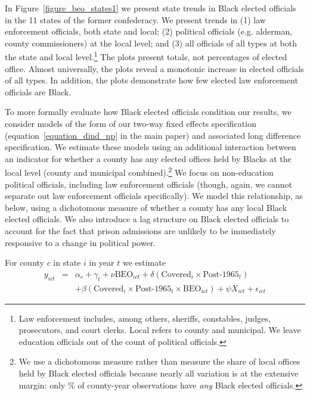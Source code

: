 \documentclass[12pt]{article}
\begin{document}
In Figure~\ref{figure_beo_states1} we present state trends in Black elected officials in the 11 states of the former confederacy.  We present trends in (1) law enforcement officials, both state and local; (2) political officials (e.g. alderman, county commissioners) at the local level; and (3) all officials of all types at both the state and local level.\footnote{Law enforcement includes, among others, sheriffs, constables, judges, prosecutors, and court clerks.  Local refers to county and municipal.  We leave education officials out of the count of political officials.}  The plots present totals, not percentages of elected office.  Almost universally, the plots reveal a monotonic increase in elected officials of all types.  In addition, the plots demonstrate how few elected law enforcement officials are Black.

To more formally evaluate how Black elected officials condition our results, we consider models of the form of our two-way fixed effects specification (equation~\ref{equation_dind_np} in the main paper) and associated long difference specification.  We estimate these models using an additional interaction between an indicator for whether a county has any elected offices held by Blacks at the local level (county and municipal combined).\footnote{We use a dichotomous measure rather than measure the share of local offices held by Black elected officials because nearly all variation is at the extensive margin: only \unskip\% of county-year observations have \emph{any} Black elected officials.}  We focus on non-education political officials, including law enforcement officials (though, again, we cannot separate out law enforcement officials specifically). We model this relationship, as below, using a dichotomous measure of whether a county has any local Black elected officials.  We also introduce a lag structure on Black elected officials to account for the fact that prison admissions are unlikely to be immediately responsive to a change in political power.

For county $c$ in state $i$ in year $t$ we estimate
\begin{align}
     y_{ict} &=& \alpha_{c} + \gamma_{t} + \nu \text{BEO}_{ict} + \delta (\text{Covered}_{i} \times \text{Post-1965}_{t}) \label{equation_beo} \\
     && + \beta (\text{Covered}_{i} \times \text{Post-1965}_{t} \times \text{BEO}_{ict}) + \psi X_{ict} + \epsilon_{ict}  \nonumber
\end{align}
\end{document}
